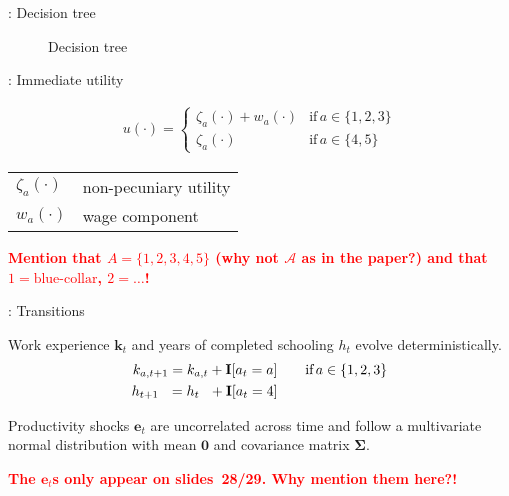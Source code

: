 \begin{frame}{\insertsection: Decision tree}
\begin{figure}
  \scalebox{0.55}{}
  \caption{Decision tree}
\end{figure}
\end{frame}
\begin{frame}{\insertsection: Immediate utility}

  \begin{align*}
  u(\cdot) =
  \begin{cases}
      \zeta_a(\cdot)  + w_a(\cdot)                & \text{if}\, a \in \{1, 2, 3\}  \\
      \zeta_a(\cdot)                                                  &  \text{if}\, a \in \{4, 5\}
  \end{cases}
  \end{align*}

\begin{table}[]
	\hskip1.5cm
	\begin{tabular}{ll}
	$\zeta_a(\cdot)$	& non-pecuniary utility \\[1.0em]
	$w_a(\cdot) $	& wage component
	\end{tabular}
\end{table}

\textbf{\textcolor{red}{Mention that $A = \{1, 2, 3, 4, 5\}$ (why not $\mathcal{A}$ as in the paper?) and that $1 = \text{blue-collar}$, $2 = \dots$!}}

\end{frame}
\begin{frame}{\insertsection: Transitions}

  Work experience $\bm{k}_t$  and years of completed schooling $h_t$ evolve deterministically.
  \begin{align*}
  k_{a,t+1} = k_{a,t} + {\textbf{I}}[a_t = a]  &\qquad \text{if}\, a \in \{1, 2, 3\} \\
  h_{t + 1\phantom{,a}} = h_{t\phantom{,a}} +   {\textbf{I}}[a_t = 4]  &\qquad
  \end{align*}

  Productivity shocks $\bm{e}_t$ are uncorrelated across time and follow a multivariate normal distribution with mean $\bm{0}$ and covariance matrix $\bm{\Sigma}$.
  
  \textbf{\textcolor{red}{The $\bm{e}_t$s only appear on slides~28/29. Why mention them here?!}}

\end{frame}
